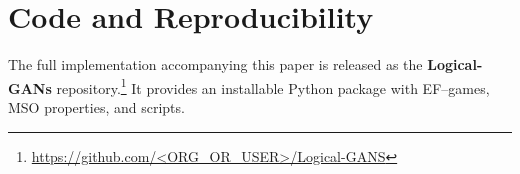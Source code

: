 \section{Code and Reproducibility}
\label{sec:code}
The full implementation accompanying this paper is released as the
\textbf{Logical-GANs} repository.\footnote{\url{https://github.com/<ORG_OR_USER>/Logical-GANS}} 
It provides an installable Python package with EF--games, MSO properties, and scripts.
